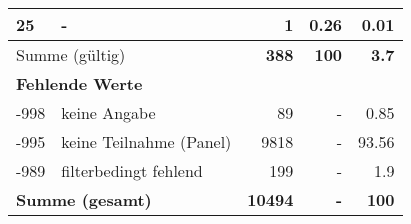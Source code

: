 \begin{longtable}{lXrrr}
     25 &
     \multicolumn{1}{X}{ -  } &


       \num{1} &
       \num[round-mode=places,round-precision=2]{0.26} &
         \num[round-mode=places,round-precision=2]{0.01} \\
     \midrule
     \multicolumn{2}{l}{Summe (gültig)} &
       \textbf{\num{388}} &
     \textbf{\num{100}} &
       \textbf{\num[round-mode=places,round-precision=2]{3.7}} \\
     \multicolumn{5}{l}{\textbf{Fehlende Werte}}\\
       -998 &
       keine Angabe &
         \num{89} &
        - &
         \num[round-mode=places,round-precision=2]{0.85} \\
       -995 &
       keine Teilnahme (Panel) &
         \num{9818} &
        - &
         \num[round-mode=places,round-precision=2]{93.56} \\
       -989 &
       filterbedingt fehlend &
         \num{199} &
        - &
         \num[round-mode=places,round-precision=2]{1.9} \\
     \midrule
     \multicolumn{2}{l}{\textbf{Summe (gesamt)}} &
          \textbf{\num{10494}} &
        \textbf{-} &
        \textbf{\num{100}} \\
     \bottomrule
     \end{longtable}
     
